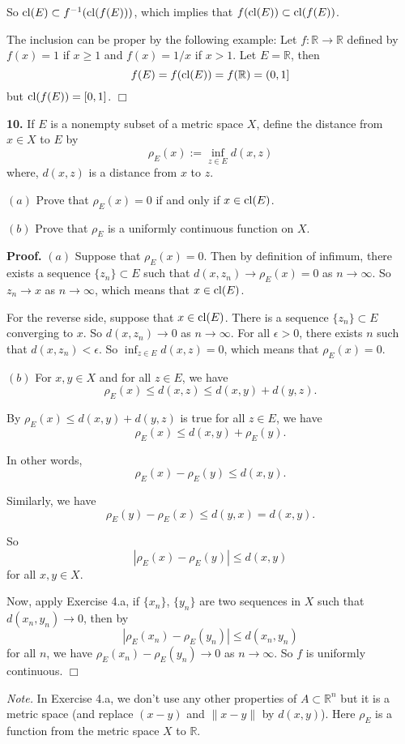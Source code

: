 \documentclass{article}
\begin{document}
So $\operatorname{cl}(E) \subset f^{-1}(\operatorname{cl}(f(E)))$, which implies that
$f(\operatorname{cl}(E)) \subset \operatorname{cl}(f(E))$.

The inclusion can be proper by the following example: Let
$f:\mathbb{R}\to \mathbb{R}$ defined by $f(x) = 1$ if $x\ge 1$ and
$f(x) = 1/x$ if $x > 1$. Let $E = \mathbb{R}$, then
\[f(E)= f(\operatorname{cl}(E)) = f(\mathbb{R}) = (0,1]\] but $\operatorname{cl}(f(E)) = [0,1]$.
$\Box$

    \textbf{10.} If $E$ is a nonempty subset of a metric space $X$, define
the distance from $x\in X$ to $E$ by
\[ \rho_E(x) := \inf_{z\in E} d(x,z)\] where, $d(x,z)$ is a distance
from $x$ to $z$.

$(a)$ Prove that $\rho_E(x) = 0$ if and only if $x\in\operatorname{cl} (E)$.

$(b)$ Prove that $\rho_E$ is a uniformly continuous function on $X$.

\textbf{Proof.} $(a)$ Suppose that $\rho_E(x) = 0$. Then by definition
of infimum, there exists a sequence $\{z_n\} \subset E$ such that
$d(x,z_n) \to \rho_E(x) = 0$ as $n\to\infty$. So $z_n \to x$ as
$n\to \infty$, which means that $x \in \operatorname{cl}(E)$.

For the reverse side, suppose that $x\in \operatorname{cl}(E)$. There is a sequence
$\{z_n\}\subset E$ converging to $x$. So $d(x,z_n) \to 0$ as
$n \to \infty$. For all $\epsilon >0$, there exists $n$ such that
$d(x,z_n) < \epsilon$. So $\inf_{z\in E} d(x,z) = 0$, which means that
$\rho_E(x) = 0$.

$(b)$ For $x,y\in X$ and for all $z\in E$, we have
\[\rho_E(x) \le d(x,z) \le d(x,y) + d(y,z).\]

By $\rho_E(x) \le d(x,y) + d(y,z)$ is true for all $z\in E$, we have
\[\rho_E(x) \le d(x,y) + \rho_E(y).\]

In other words, \[\rho_E(x) - \rho_E(y) \le d(x,y).\]

Similarly, we have \[\rho_E(y) - \rho_E(x) \le d(y,x)=d(x,y).\]

So \[|\rho_E(x) - \rho_E(y)| \le d(x,y)\] for all $x,y\in X$.

Now, apply Exercise 4.a, if $\{x_n\}$, $\{y_n\}$ are two sequences in
$X$ such that $d(x_n,y_n) \to 0$, then by
\[ |\rho_E(x_n) - \rho_E(y_n)| \le d(x_n,y_n) \] for all $n$, we have
$\rho_E(x_n) - \rho_E(y_n) \to 0$ as $n\to \infty$. So $f$ is uniformly
continuous. $\Box$

\emph{Note.} In Exercise 4.a, we don't use any other properties of
$A\subset \mathbb{R}^n$ but it is a metric space (and replace $(x-y)$
and $\|x-y\|$ by $d(x,y)$). Here $\rho_E$ is a function from the metric
space $X$ to $\mathbb{R}$.


    
    
    
    
\end{document}
